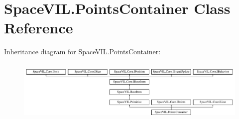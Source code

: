 \hypertarget{class_space_v_i_l_1_1_points_container}{}\section{Space\+V\+I\+L.\+Points\+Container Class Reference}
\label{class_space_v_i_l_1_1_points_container}
Inheritance diagram for Space\+V\+I\+L.\+Points\+Container\+:\begin{figure}[H]
\begin{center}
\leavevmode
\includegraphics[height=3.027027cm]{class_space_v_i_l_1_1_points_container}
\end{center}
\end{figure}
